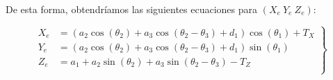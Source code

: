 \documentclass[a4paper,12pt]{article}
\begin{document}
De esta forma, obtendríamos las siguientes ecuaciones para $(X_e ~ Y_e ~ Z_e)$:

\begin{equation*}
    \left.\begin{aligned}
        X_e & = \left(a_{2} \cos{\left(\theta_{2} \right)} + a_{3} \cos{\left(\theta_{2} - \theta_{3} \right)} + d_{1}\right) \cos{\left(\theta_{1} \right)} + T_X \\
        Y_e & = \left(a_{2} \cos{\left(\theta_{2} \right)} + a_{3} \cos{\left(\theta_{2} - \theta_{3} \right)} + d_{1}\right) \sin{\left(\theta_{1} \right)}       \\
        Z_e & = a_{1} + a_{2} \sin{\left(\theta_{2} \right)} + a_{3} \sin{\left(\theta_{2} - \theta_{3} \right)} - T_{Z}                                           \\
    \end{aligned}
    \right\}
\end{equation*}

\newpage
\printbibliography
\end{document}
